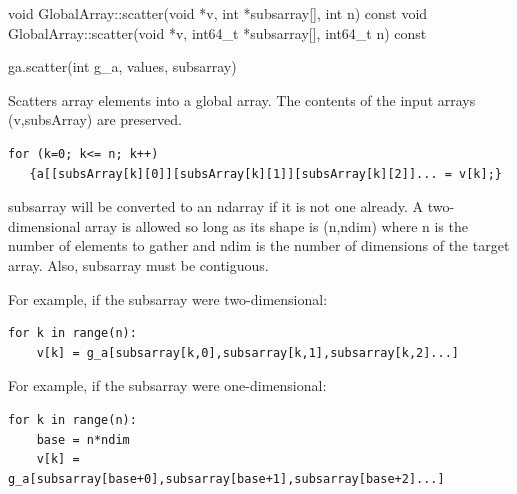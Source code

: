 \documentclass[12pt]{article}
\begin{document}
\begin{cxxapi}
\begin{cxxcode}
void GlobalArray::scatter(void *v, int *subsarray[], int n) const
void GlobalArray::scatter(void *v, int64_t *subsarray[], int64_t n) const
\end{cxxcode}
\begin{funcargs}
\end{funcargs}
\end{cxxapi}

\begin{pyapi}
\begin{pycode}
ga.scatter(int g_a, values, subsarray)
\end{pycode}
\begin{funcargs}
\end{funcargs}
\end{pyapi}

\ncoll

\begin{desc}

Scatters array elements into a global array. The contents of the input arrays
(v,subsArray) are preserved.

\begin{verbatim}
for (k=0; k<= n; k++)
   {a[[subsArray[k][0]][subsArray[k][1]][subsArray[k][2]]... = v[k];}
\end{verbatim}

\end{desc}

\begin{pydesc}

subsarray will be converted to an ndarray if it is not one already.  A
two-dimensional array is allowed so long as its shape is (n,ndim) where n is
the number of elements to gather and ndim is the number of dimensions of the
target array. Also, subsarray must be contiguous.

For example, if the subsarray were two-dimensional:

\begin{verbatim}
for k in range(n):
    v[k] = g_a[subsarray[k,0],subsarray[k,1],subsarray[k,2]...]
\end{verbatim}

For example, if the subsarray were one-dimensional:

\begin{verbatim}
for k in range(n):
    base = n*ndim
    v[k] = g_a[subsarray[base+0],subsarray[base+1],subsarray[base+2]...]
\end{verbatim}

\end{pydesc}
\end{document}
